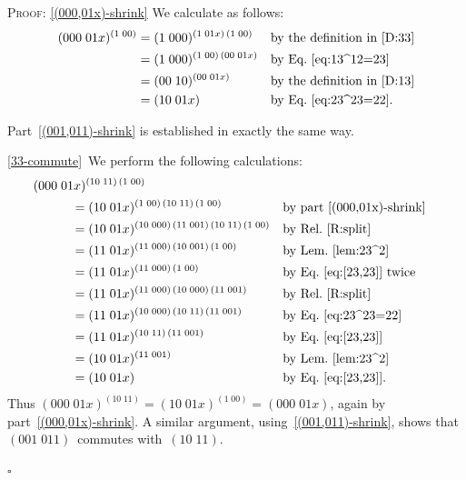 \documentclass[a4paper,11pt]{article}
\numberwithin{equation}{section}
\newcommand{\swap}[2]{(#1\;#2)}
\newcommand{\qed}{\hspace*{\fill}$\square$}
\newenvironment{proof}{%
  \begin{trivlist}\item\textsc{Proof:}}{\qed\end{trivlist}}
\begin{document}
\begin{proof}
  \ref{(000,01x)-shrink} We calculate as follows:
  \begin{align*}
    \swap{000}{01x}^{\swap{1}{00}} &=
    \swap{1}{000}^{\swap{1}{01x} \, \swap{1}{00}}
    &&\text{by the definition in~\eqref{D:33}} \\
    &= \swap{1}{000}^{\swap{1}{00} \, \swap{00}{01x}}
    &&\text{by Eq.~\eqref{eq:13^12=23}} \\
    &= \swap{00}{10}^{\swap{00}{01x}}
    &&\text{by the definition in~\eqref{D:13}} \\
    &= \swap{10}{01x}
    &&\text{by Eq.~\eqref{eq:23^23=22}.}
  \end{align*}

  Part~\ref{(001,011)-shrink} is established in exactly the same way.

  \ref{33-commute}~We perform the following calculations:
  \begin{align*}
    \lefteqn{\swap{000}{01x}^{\swap{10}{11} \, \swap{1}{00}}} \hspace*{3em} & \\*
    &= \swap{10}{01x}^{\swap{1}{00} \, \swap{10}{11} \, \swap{1}{00}}
    &&\text{by part~\ref{(000,01x)-shrink}} \\
    &= \swap{10}{01x}^{\swap{10}{000} \, \swap{11}{001} \,
      \swap{10}{11} \, \swap{1}{00}}
    &&\text{by Rel.~\ref{R:split}} \\
    &= \swap{11}{01x}^{\swap{11}{000} \, \swap{10}{001} \,
      \swap{1}{00}}
    &&\text{by Lem.~\ref{lem:23^2}} \\
    &= \swap{11}{01x}^{\swap{11}{000} \, \swap{1}{00}}
    &&\text{by Eq.~\eqref{eq:[23,23]} twice} \\
    &= \swap{11}{01x}^{\swap{11}{000} \, \swap{10}{000} \,
      \swap{11}{001}}
    &&\text{by Rel.~\ref{R:split}} \\
    &= \swap{11}{01x}^{\swap{10}{000} \, \swap{10}{11} \,
      \swap{11}{001}}
    &&\text{by Eq.~\eqref{eq:23^23=22}} \\
    &= \swap{11}{01x}^{\swap{10}{11} \, \swap{11}{001}}
    &&\text{by Eq.~\eqref{eq:[23,23]}} \\
    &= \swap{10}{01x}^{\swap{11}{001}}
    &&\text{by Lem.~\ref{lem:23^2}} \\
    &= \swap{10}{01x}
    &&\text{by Eq.~\eqref{eq:[23,23]}.}
  \end{align*}
  Thus $\swap{000}{01x}^{\swap{10}{11}} =
  \swap{10}{01x}^{\swap{1}{00}} = \swap{000}{01x}$, again by
  part~\ref{(000,01x)-shrink}.  A similar argument,
  using~\ref{(001,011)-shrink}, shows that $\swap{001}{011}$~commutes
  with~$\swap{10}{11}$.


\end{proof}
\end{document}
